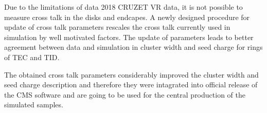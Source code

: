 

Due to the limitations of data 2018 CRUZET VR data, it is not possible to measure cross talk in the disks and endcapes. A newly designed procedure for update of cross talk parameters rescales the cross talk currently used in simulation  by well motivated factors. The update of parameters leads to better agreement between data and simulation in cluster width and seed charge for rings of TEC and TID.



The obtained cross talk parameters considerably improved the cluster width and seed charge description and therefore they were intagrated into official release of the CMS software and are going to be used for the central production of the simulated samples.

